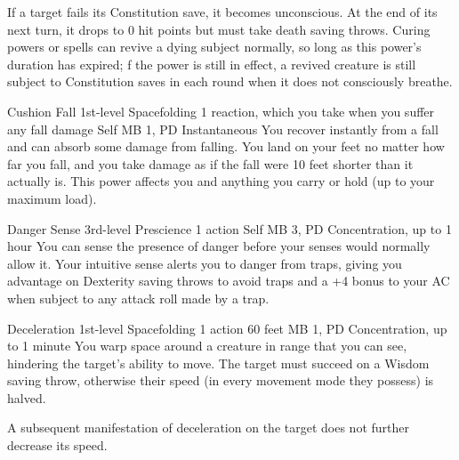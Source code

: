 If a target fails its Constitution save,
it becomes unconscious.
At the end of its next turn,
it drops to 0 hit points
but must take death saving throws.
Curing powers or spells can revive a dying subject normally,
so long as this power's duration has expired; 
f the power is still in effect,
a revived creature is still subject to Constitution saves
in each round when it does not consciously breathe.

\DndPowerHeader%
  {Cushion Fall}
  {1st-level Spacefolding}
  {1 reaction, which you take when you suffer any fall damage}
  {Self}
  {MB 1, PD \lvlone}
  {Instantaneous}
You recover instantly from a fall
and can absorb some damage from falling.
You land on your feet no matter how far you fall,
and you take damage as if the fall were
10 feet shorter than it actually is.
This power affects you and anything you carry or hold
(up to your maximum load).

\DndPowerHeader%
  {Danger Sense}
  {3rd-level Prescience}
  {1 action}
  {Self}
  {MB 3, PD \lvlthree}
  {Concentration, up to 1 hour}
You can sense the presence of danger
before your senses would normally allow it.
Your intuitive sense alerts you to danger from traps,
giving you advantage on Dexterity saving throws to avoid traps
and a +4 bonus to your AC when subject to any attack roll
made by a trap.

\DndPowerHeader%
  {Deceleration}
  {1st-level Spacefolding}
  {1 action}
  {60 feet}
  {MB 1, PD \lvlone}
  {Concentration, up to 1 minute}
You warp space around a creature in range that you can see,
hindering the target's ability to move.
The target must succeed on a Wisdom saving throw,
otherwise their speed
(in every movement mode they possess) is halved.

A subsequent manifestation of deceleration on the target
does not further decrease its speed.

